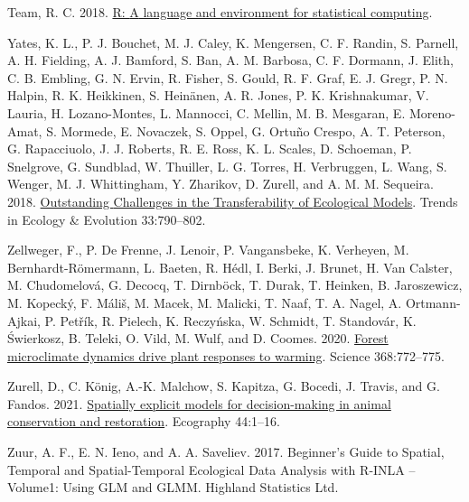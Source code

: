 \documentclass[
  12pt,
  a4paper]{article}
\newlength{\cslhangindent}
\newlength{\cslentryspacingunit} %
\newenvironment{CSLReferences}[2] %
 {%
  \setlength{\parindent}{0pt}
  \ifodd #1
  \let\oldpar\par
  \def\par{\hangindent=\cslhangindent\oldpar}
  \fi
  \setlength{\parskip}{#2\cslentryspacingunit}
 }%
 {}
\begin{document}
\begin{CSLReferences}{1}{0}
\leavevmode{}%
Team, R. C. 2018. \href{https://www.R-project.org/}{R: {A} language and environment for statistical computing}.

\leavevmode{}%
Yates, K. L., P. J. Bouchet, M. J. Caley, K. Mengersen, C. F. Randin, S. Parnell, A. H. Fielding, A. J. Bamford, S. Ban, A. M. Barbosa, C. F. Dormann, J. Elith, C. B. Embling, G. N. Ervin, R. Fisher, S. Gould, R. F. Graf, E. J. Gregr, P. N. Halpin, R. K. Heikkinen, S. Heinänen, A. R. Jones, P. K. Krishnakumar, V. Lauria, H. Lozano-Montes, L. Mannocci, C. Mellin, M. B. Mesgaran, E. Moreno-Amat, S. Mormede, E. Novaczek, S. Oppel, G. Ortuño Crespo, A. T. Peterson, G. Rapacciuolo, J. J. Roberts, R. E. Ross, K. L. Scales, D. Schoeman, P. Snelgrove, G. Sundblad, W. Thuiller, L. G. Torres, H. Verbruggen, L. Wang, S. Wenger, M. J. Whittingham, Y. Zharikov, D. Zurell, and A. M. M. Sequeira. 2018. \href{https://doi.org/10.1016/j.tree.2018.08.001}{Outstanding {Challenges} in the {Transferability} of {Ecological} {Models}}. Trends in Ecology \& Evolution 33:790--802.

\leavevmode{}%
Zellweger, F., P. De Frenne, J. Lenoir, P. Vangansbeke, K. Verheyen, M. Bernhardt-Römermann, L. Baeten, R. Hédl, I. Berki, J. Brunet, H. Van Calster, M. Chudomelová, G. Decocq, T. Dirnböck, T. Durak, T. Heinken, B. Jaroszewicz, M. Kopecký, F. Máliš, M. Macek, M. Malicki, T. Naaf, T. A. Nagel, A. Ortmann-Ajkai, P. Petřík, R. Pielech, K. Reczyńska, W. Schmidt, T. Standovár, K. Świerkosz, B. Teleki, O. Vild, M. Wulf, and D. Coomes. 2020. \href{https://doi.org/10.1126/science.aba6880}{Forest microclimate dynamics drive plant responses to warming}. Science 368:772--775.

\leavevmode{}%
Zurell, D., C. König, A.-K. Malchow, S. Kapitza, G. Bocedi, J. Travis, and G. Fandos. 2021. \href{https://doi.org/10.1111/ecog.05787}{Spatially explicit models for decision-making in animal conservation and restoration}. Ecography 44:1--16.

\leavevmode{}%
Zuur, A. F., E. N. Ieno, and A. A. Saveliev. 2017. Beginner's {Guide} to {Spatial}, {Temporal} and {Spatial}-{Temporal} {Ecological} {Data} {Analysis} with {R}-{INLA} -- {Volume1}: {Using} {GLM} and {GLMM}. Highland Statistics Ltd.

\end{CSLReferences}
\end{document}

